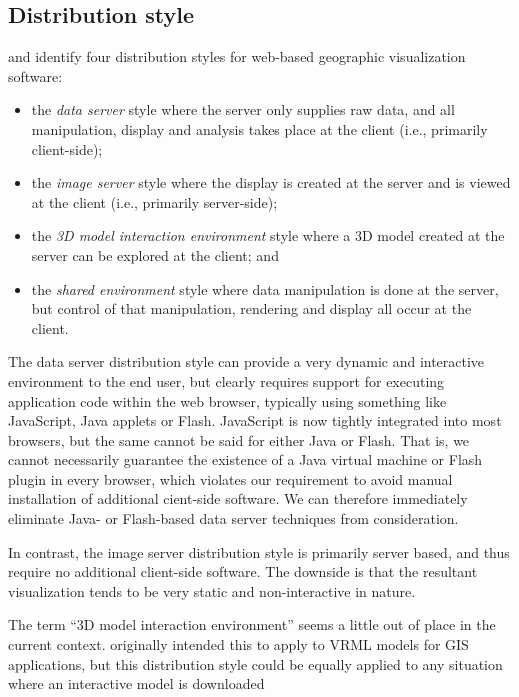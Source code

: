 \documentclass[acmtocl,acmnow]{acmtrans2m}
\begin{document}
\subsection{Distribution style}

 and  identify four
distribution styles for web-based geographic visualization software:
\begin{itemize}

	\item the \emph{data server} style where the server only supplies
	raw data, and all manipulation, display and analysis takes place at
	the client (i.e., primarily client-side);
	
	\item the \emph{image server} style where the display is created at
	the server and is viewed at the client (i.e., primarily server-side);
	
	\item the \emph{3D model interaction environment} style where a 3D
	model created at the server can be explored at the client; and
	
	\item the \emph{shared environment} style where data manipulation is
	done at the server, but control of that manipulation, rendering and
	display all occur at the client.

\end{itemize}

The data server distribution style can provide a very dynamic and
interactive environment to the end user, but clearly requires support
for executing application code within the web browser, typically using
something like JavaScript, Java applets or Flash. JavaScript is now
tightly integrated into most browsers, but the same cannot be said for
either Java or Flash. That is, we cannot necessarily guarantee the
existence of a Java virtual machine or Flash plugin in every browser,
which violates our requirement to avoid manual installation of
additional cient-side software. We can therefore immediately eliminate
Java- or Flash-based data server techniques from consideration.

In contrast, the image server distribution style is primarily server
based, and thus require no additional client-side software. The downside
is that the resultant visualization tends to be very static and
non-interactive in nature.

The term ``3D model interaction environment'' seems a little out of place
in the current context. 
originally intended this to apply to VRML models for GIS applications,
but this distribution style could
be equally applied to any situation where an interactive model is downloaded
\end{document}

